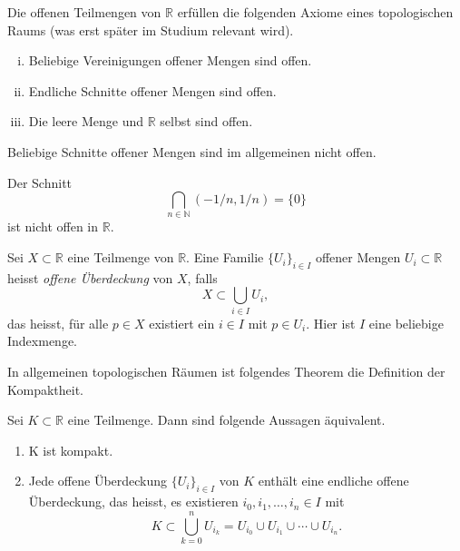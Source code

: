 \documentclass[../main.tex]{subfiles}
\begin{document}
\begin{remark}
  Die offenen Teilmengen von $\mathbb{R}$ 
  erfüllen die folgenden Axiome
  eines topologischen Raums (was
  erst später im Studium relevant wird).
  \begin{enumerate}[(i)]
    \item Beliebige Vereinigungen
      offener Mengen sind offen.
    \item Endliche Schnitte offener
      Mengen sind offen.
    \item Die leere Menge und $\mathbb{R}$ selbst
      sind offen.
  \end{enumerate}
\end{remark}

\begin{warning}
  Beliebige Schnitte offener Mengen sind
  im allgemeinen
  nicht offen. 
\end{warning}

\begin{example}
  Der Schnitt
  \[
    \bigcap_{n \in \mathbb{N}} (-1/n, 1/n) = \{0\}
  \]
  ist nicht offen in $\mathbb{R}$.
\end{example}

\begin{definition}
Sei $X \subset \mathbb{R}$ eine
Teilmenge von $\mathbb{R}$.
Eine Familie ${\{U_i\}}_{i \in I}$ 
offener Mengen $U_i \subset \mathbb{R}$
heisst \emph{offene Überdeckung}
von $X$, falls
\[
  X \subset \bigcup_{i \in I} U_i,
\]
das heisst, für alle  $p \in X$ 
existiert ein $i \in I$ 
mit $p \in U_i$.
Hier ist $I$ eine
beliebige Indexmenge.
\end{definition}

In allgemeinen topologischen Räumen
ist folgendes Theorem 
die Definition der Kompaktheit.

\begin{theorem}\label{thm:heine-borel}
  Sei $K \subset \mathbb{R}$ eine Teilmenge.
  Dann sind folgende Aussagen äquivalent.
  \begin{enumerate}[\normalfont(i)]
    \item K ist kompakt.
    \item Jede offene Überdeckung ${\{U_i\}}_{i \in I}$ 
      von $K$ enthält eine endliche offene Überdeckung,
      das heisst, es existieren
      $i_0,i_1, \dots, i_n \in I$ mit
      \[
        K \subset \bigcup_{k = 0}^n U_{i_k}
        = U_{i_0} \cup U_{i_1} \cup \cdots
        \cup U_{i_n}.
      \]
  \end{enumerate}
\end{theorem}
\end{document}
